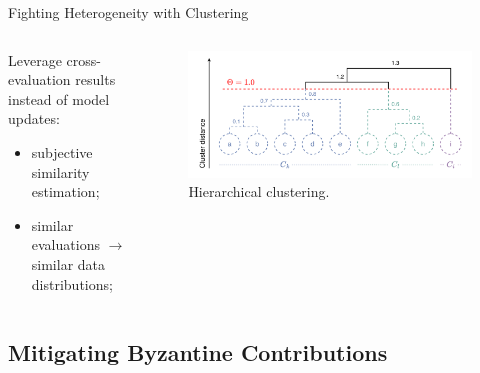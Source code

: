\begin{frame}{Fighting Heterogeneity with Clustering}
    \begin{columns}
        \begin{column}{.4\textwidth}

        Leverage cross-evaluation results instead of model updates:
        \begin{itemize}
            \item subjective similarity estimation;
            \item similar evaluations $\rightarrow$ similar data distributions;
        \end{itemize}

        \end{column}
        \begin{column}{.6\textwidth}
            \begin{figure}
                \centering
                \includegraphics[width=\textwidth]{figures/radar/clustering.drawio.pdf}
                \caption{Hierarchical clustering.}
            \end{figure}
        \end{column}
    \end{columns}
\end{frame}



\subsection{Mitigating Byzantine Contributions}

